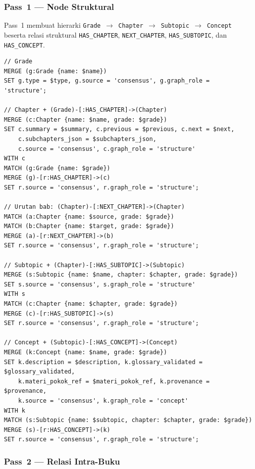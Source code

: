 \documentclass[../../thesis]{subfiles}
\begin{document}
\subsubsection{Pass~1 --- Node Struktural}

Pass~1 membuat hierarki \texttt{Grade}~$\rightarrow$~\texttt{Chapter}~$\rightarrow$~\texttt{Subtopic}~$\rightarrow$~\texttt{Concept}
beserta relasi struktural \texttt{HAS\_CHAPTER}, \texttt{NEXT\_CHAPTER},
\texttt{HAS\_SUBTOPIC}, dan \texttt{HAS\_CONCEPT}.

\begin{lstlisting}[style=cypherbox,caption={Pembuatan node dan relasi struktural (Pass~1).},label={lst:cypher-pass1}]
// Grade
MERGE (g:Grade {name: $name})
SET g.type = $type, g.source = 'consensus', g.graph_role = 'structure';

// Chapter + (Grade)-[:HAS_CHAPTER]->(Chapter)
MERGE (c:Chapter {name: $name, grade: $grade})
SET c.summary = $summary, c.previous = $previous, c.next = $next,
    c.subchapters_json = $subchapters_json,
    c.source = 'consensus', c.graph_role = 'structure'
WITH c
MATCH (g:Grade {name: $grade})
MERGE (g)-[r:HAS_CHAPTER]->(c)
SET r.source = 'consensus', r.graph_role = 'structure';

// Urutan bab: (Chapter)-[:NEXT_CHAPTER]->(Chapter)
MATCH (a:Chapter {name: $source, grade: $grade})
MATCH (b:Chapter {name: $target, grade: $grade})
MERGE (a)-[r:NEXT_CHAPTER]->(b)
SET r.source = 'consensus', r.graph_role = 'structure';

// Subtopic + (Chapter)-[:HAS_SUBTOPIC]->(Subtopic)
MERGE (s:Subtopic {name: $name, chapter: $chapter, grade: $grade})
SET s.source = 'consensus', s.graph_role = 'structure'
WITH s
MATCH (c:Chapter {name: $chapter, grade: $grade})
MERGE (c)-[r:HAS_SUBTOPIC]->(s)
SET r.source = 'consensus', r.graph_role = 'structure';

// Concept + (Subtopic)-[:HAS_CONCEPT]->(Concept)
MERGE (k:Concept {name: $name, grade: $grade})
SET k.description = $description, k.glossary_validated = $glossary_validated,
    k.materi_pokok_ref = $materi_pokok_ref, k.provenance = $provenance,
    k.source = 'consensus', k.graph_role = 'concept'
WITH k
MATCH (s:Subtopic {name: $subtopic, chapter: $chapter, grade: $grade})
MERGE (s)-[r:HAS_CONCEPT]->(k)
SET r.source = 'consensus', r.graph_role = 'structure';
\end{lstlisting}

\subsubsection{Pass~2 --- Relasi Intra-Buku}
\end{document}

